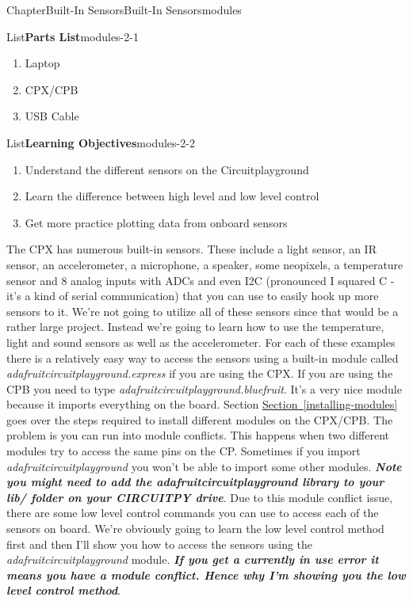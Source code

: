 \documentclass[oneside,10pt,]{book}
\newcommand{\xreffont}{\relax}
\newcommand{\linkhilite}[1]{\underline{#1}}
\newcommand{\alert}[1]{\textbf{\textit{#1}}}
\numberwithin{equation}{section}
\begin{document}
\begin{chapterptx}{Chapter}{Built-In Sensors}{}{Built-In Sensors}{}{}{modules}
\renewcommand*{\chaptername}{Chapter}
\begin{introduction}{}%
\begin{listptx}{List}{\textbf{Parts List}}{modules-2-1}{}%
%
\begin{enumerate}
\item{}Laptop%
\item{}CPX\slash{}CPB%
\item{}USB Cable%
\end{enumerate}
\end{listptx}%
\begin{listptx}{List}{\textbf{Learning Objectives}}{modules-2-2}{}%
%
\begin{enumerate}
\item{}Understand the different sensors on the Circuitplayground%
\item{}Learn the difference between high level and low level control%
\item{}Get more practice plotting data from onboard sensors%
\end{enumerate}
\end{listptx}%
The CPX has numerous built-in sensors. These include a light sensor, an IR sensor, an accelerometer, a microphone, a speaker, some neopixels, a temperature sensor and 8 analog inputs with ADCs and even I2C (pronounced I squared C - it's a kind of serial communication) that you can use to easily hook up more sensors to it. We're not going to utilize all of these sensors since that would be a rather large project. Instead we're going to learn how to use the temperature, light and sound sensors as well as the accelerometer. For each of these examples there is a relatively easy way to access the sensors using a built-in module called \emph{adafruit\textunderscore{}circuitplayground.express} if you are using the CPX. If you are using the CPB you need to type \emph{adafruit\textunderscore{}circuitplayground.bluefruit}. It's a very nice module because it imports everything on the board. Section \hyperref[installing-modules]{\linkhilite{Section~{\xreffont\ref{installing-modules}}}} goes over the steps required to install different modules on the CPX\slash{}CPB. The problem is you can run into module conflicts. This happens when two different modules try to access the same pins on the CP. Sometimes if you import \emph{adafruit\textunderscore{}circuitplayground} you won't be able to import some other modules. \alert{Note you might need to add the \emph{adafruit\textunderscore{}circuitplayground} library to your lib\slash{} folder on your CIRCUITPY drive}. Due to this module conflict issue, there are some low level control commands you can use to access each of the sensors on board. We're obviously going to learn the low level control method first and then I'll show you how to access the sensors using the \emph{adafruit\textunderscore{}circuitplayground} module. \alert{If you get a \emph{currently in use} error it means you have a module conflict. Hence why I'm showing you the low level control method}.%

\end{introduction}
\end{chapterptx}
\end{document}
